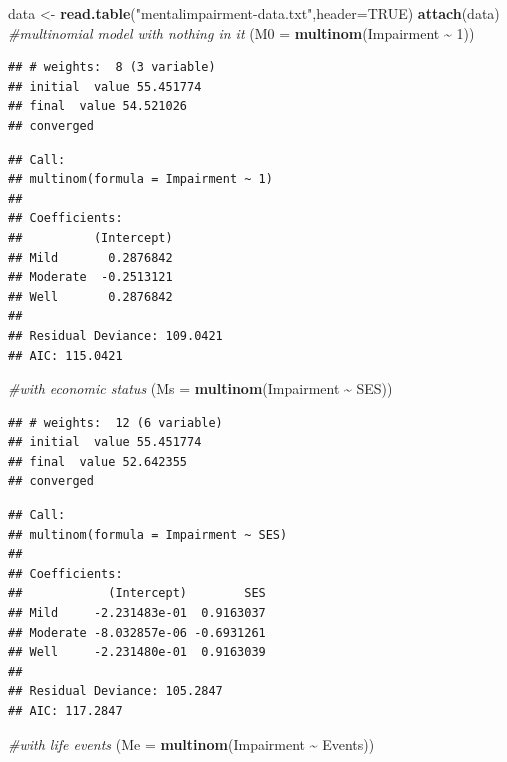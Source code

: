 \documentclass[
]{article}
\newenvironment{Shaded}{\begin{snugshade}}{\end{snugshade}}
\newcommand{\AttributeTok}[1]{\textcolor[rgb]{0.13,0.29,0.53}{#1}}
\newcommand{\CommentTok}[1]{\textcolor[rgb]{0.56,0.35,0.01}{\textit{#1}}}
\newcommand{\ConstantTok}[1]{\textcolor[rgb]{0.56,0.35,0.01}{#1}}
\newcommand{\DecValTok}[1]{\textcolor[rgb]{0.00,0.00,0.81}{#1}}
\newcommand{\FunctionTok}[1]{\textcolor[rgb]{0.13,0.29,0.53}{\textbf{#1}}}
\newcommand{\NormalTok}[1]{#1}
\newcommand{\OtherTok}[1]{\textcolor[rgb]{0.56,0.35,0.01}{#1}}
\newcommand{\SpecialCharTok}[1]{\textcolor[rgb]{0.81,0.36,0.00}{\textbf{#1}}}
\newcommand{\StringTok}[1]{\textcolor[rgb]{0.31,0.60,0.02}{#1}}
\begin{document}
\begin{Shaded}
\begin{Highlighting}[]
\NormalTok{data }\OtherTok{\textless{}{-}} \FunctionTok{read.table}\NormalTok{(}\StringTok{"mentalimpairment{-}data.txt"}\NormalTok{,}\AttributeTok{header=}\ConstantTok{TRUE}\NormalTok{)}
\FunctionTok{attach}\NormalTok{(data)}
\CommentTok{\#multinomial model with nothing in it }
\NormalTok{(}\AttributeTok{M0 =} \FunctionTok{multinom}\NormalTok{(Impairment }\SpecialCharTok{\textasciitilde{}} \DecValTok{1}\NormalTok{))}
\end{Highlighting}
\end{Shaded}

\begin{verbatim}
## # weights:  8 (3 variable)
## initial  value 55.451774 
## final  value 54.521026 
## converged
\end{verbatim}

\begin{verbatim}
## Call:
## multinom(formula = Impairment ~ 1)
## 
## Coefficients:
##          (Intercept)
## Mild       0.2876842
## Moderate  -0.2513121
## Well       0.2876842
## 
## Residual Deviance: 109.0421 
## AIC: 115.0421
\end{verbatim}

\begin{Shaded}
\begin{Highlighting}[]
\CommentTok{\#with economic status}
\NormalTok{(}\AttributeTok{Ms =} \FunctionTok{multinom}\NormalTok{(Impairment }\SpecialCharTok{\textasciitilde{}}\NormalTok{ SES))}
\end{Highlighting}
\end{Shaded}

\begin{verbatim}
## # weights:  12 (6 variable)
## initial  value 55.451774 
## final  value 52.642355 
## converged
\end{verbatim}

\begin{verbatim}
## Call:
## multinom(formula = Impairment ~ SES)
## 
## Coefficients:
##            (Intercept)        SES
## Mild     -2.231483e-01  0.9163037
## Moderate -8.032857e-06 -0.6931261
## Well     -2.231480e-01  0.9163039
## 
## Residual Deviance: 105.2847 
## AIC: 117.2847
\end{verbatim}

\begin{Shaded}
\begin{Highlighting}[]
\CommentTok{\#with life events}
\NormalTok{(}\AttributeTok{Me =} \FunctionTok{multinom}\NormalTok{(Impairment }\SpecialCharTok{\textasciitilde{}}\NormalTok{ Events))}
\end{Highlighting}
\end{Shaded}
\end{document}
